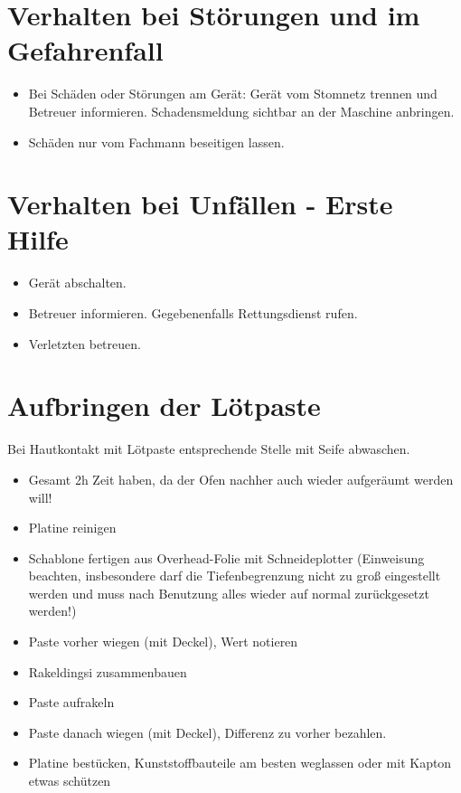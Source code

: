 \documentclass{\basedir/fablab-document}
\begin{document}
\section{Verhalten bei Störungen und im Gefahrenfall}
\begin{itemize}
	\item Bei Schäden oder Störungen am Gerät: Gerät vom Stomnetz trennen und Betreuer informieren. Schadensmeldung sichtbar an der Maschine anbringen.
	\item Schäden nur vom Fachmann beseitigen lassen.
\end{itemize}

\section{Verhalten bei Unfällen - Erste Hilfe}
\begin{itemize}
	\item Gerät abschalten. 
	\item Betreuer informieren. Gegebenenfalls Rettungsdienst rufen.
	\item Verletzten betreuen.
\end{itemize}

\secttoc
\tableofcontents

\section{Aufbringen der Lötpaste}

Bei Hautkontakt mit Lötpaste entsprechende Stelle mit Seife abwaschen. 

\begin{itemize}
\item Gesamt 2h Zeit haben, da der Ofen nachher auch wieder aufgeräumt werden will!
\item Platine reinigen
\item Schablone fertigen aus Overhead-Folie mit Schneideplotter (Einweisung beachten, insbesondere darf die Tiefenbegrenzung nicht zu groß eingestellt werden und muss nach Benutzung alles wieder auf normal zurückgesetzt werden!)
\item Paste vorher wiegen (mit Deckel), Wert notieren
\item Rakeldingsi zusammenbauen
\item Paste aufrakeln
\item Paste danach wiegen (mit Deckel), Differenz zu vorher bezahlen.
\item Platine bestücken, Kunststoffbauteile am besten weglassen oder mit Kapton etwas schützen
\end{itemize}
\end{document}
